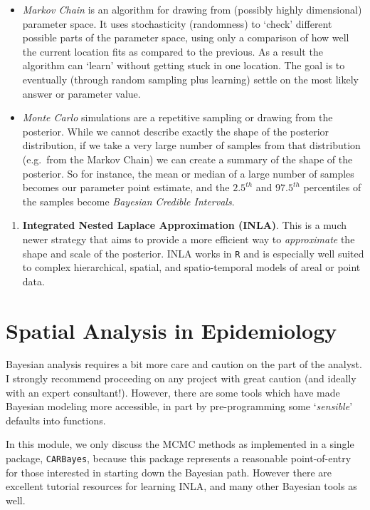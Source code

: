 \documentclass[
]{book}
\providecommand{\tightlist}{%
  \setlength{\itemsep}{0pt}\setlength{\parskip}{0pt}}
\begin{document}
\begin{itemize}
\tightlist
\item
  \emph{Markov Chain} is an algorithm for drawing from (possibly highly dimensional) parameter space. It uses stochasticity (randomness) to `check' different possible parts of the parameter space, using only a comparison of how well the current location fits as compared to the previous. As a result the algorithm can `learn' without getting stuck in one location. The goal is to eventually (through random sampling plus learning) settle on the most likely answer or parameter value.
\item
  \emph{Monte Carlo} simulations are a repetitive sampling or drawing from the posterior. While we cannot describe exactly the shape of the posterior distribution, if we take a very large number of samples from that distribution (e.g.~from the Markov Chain) we can create a summary of the shape of the posterior. So for instance, the mean or median of a large number of samples becomes our parameter point estimate, and the \(2.5^{th}\) and \(97.5^{th}\) percentiles of the samples become \emph{Bayesian Credible Intervals}.
\end{itemize}

\begin{enumerate}
\def\labelenumi{\arabic{enumi}.}
\setcounter{enumi}{1}
\tightlist
\item
  \textbf{Integrated Nested Laplace Approximation (INLA)}. This is a much newer strategy that aims to provide a more efficient way to \emph{approximate} the shape and scale of the posterior. INLA works in \texttt{R} and is especially well suited to complex hierarchical, spatial, and spatio-temporal models of areal or point data.
\end{enumerate}

\hypertarget{spatial-analysis-in-epidemiology-4}{%
\section{Spatial Analysis in Epidemiology}\label{spatial-analysis-in-epidemiology-4}}

Bayesian analysis requires a bit more care and caution on the part of the analyst. I strongly recommend proceeding on any project with great caution (and ideally with an expert consultant!). However, there are some tools which have made Bayesian modeling more accessible, in part by pre-programming some `\emph{sensible}' defaults into functions.

In this module, we only discuss the MCMC methods as implemented in a single package, \texttt{CARBayes}, because this package represents a reasonable point-of-entry for those interested in starting down the Bayesian path. However there are excellent tutorial resources for learning INLA, and many other Bayesian tools as well.
\end{document}
